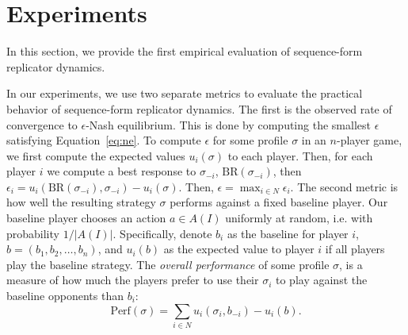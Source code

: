 \documentclass{aamas2014}
\newcommand{\BR}{\mbox{BR}}
\begin{document}

\section{Experiments}
\label{sec:exp}

 
In this section, we provide the first empirical evaluation of sequence-form replicator dynamics. 

In our experiments, we use two separate metrics to evaluate the practical behavior of sequence-form replicator dynamics. 
The first is the observed rate of convergence to $\epsilon$-Nash equilibrium. This is done by computing the smallest 
$\epsilon$ satisfying Equation~\ref{eq:ne}. To compute $\epsilon$ for some profile $\sigma$ in an $n$-player game, we first
compute the expected values $u_i(\sigma)$ to each player. 
Then, for each player $i$ we compute a best response to $\sigma_{-i}$, $\BR(\sigma_{-i})$, then 
$\epsilon_i = u_i(\BR(\sigma_{-i}), \sigma_{-i}) - u_i(\sigma)$. Then, $\epsilon = \max_{i \in N} \epsilon_i$. 
The second metric is how well the resulting strategy $\sigma$ performs against a fixed baseline player. Our baseline player 
chooses an action $a \in A(I)$ uniformly at random, i.e. with probability $1/|A(I)|$. Specifically, denote 
$b_i$ as the baseline for player $i$, $b = (b_1, b_2, \ldots, b_n)$, and $u_i(b)$ as the expected value to player $i$
if all players play the baseline strategy. The {\it overall performance} of some profile $\sigma$,  is a measure of how 
much the players prefer to use their $\sigma_i$ to play against the baseline opponents than $b_i$:
\begin{equation}
\mbox{Perf}(\sigma) = \sum_{i \in N} u_i(\sigma_i, b_{-i}) - u_i(b).
\end{equation}
\end{document}
